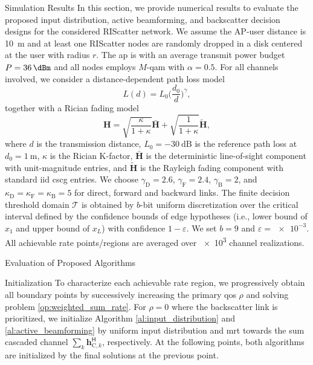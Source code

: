 \documentclass[journal]{IEEEtran}
\begin{document}
\begin{section}{Simulation Results}
	In this section, we provide numerical results to evaluate the proposed input distribution, active beamforming, and backscatter decision designs for the considered RIScatter network.
	We assume the AP-user distance is \SI{10}{\meter} and at least one RIScatter nodes are randomly dropped in a disk centered at the user with radius $r$.
	The \gls{ap} is with an average transmit power budget $P=\SI{36}{\dBm}$ and all nodes employs $M$-\gls{qam} with $\alpha=0.5$.
	For all channels involved, we consider a distance-dependent path loss model
	\begin{equation}
		L(d) = L_0 \biggl(\frac{d_0}{d}\biggr)^\gamma,
	\end{equation}
	together with a Rician fading model
	\begin{equation}
		\boldsymbol{H} = \sqrt{\frac{\kappa}{1+\kappa}} \bar{\boldsymbol{H}} + \sqrt{\frac{1}{1+\kappa}} \tilde{\boldsymbol{H}},
	\end{equation}
	where $d$ is the transmission distance, $L_0=-\SI{30}{\dB}$ is the reference path loss at $d_0=\SI{1}{\meter}$, $\kappa$ is the Rician K-factor, $\bar{\boldsymbol{H}}$ is the deterministic line-of-sight component with unit-magnitude entries, and $\tilde{\boldsymbol{H}}$ is the Rayleigh fading component with standard \gls{iid} \gls{cscg} entries.
	We choose $\gamma_{\text{D}}=2.6$, $\gamma_{\text{F}}=2.4$, $\gamma_{\text{B}}=2$, and $\kappa_{\text{D}}=\kappa_{\text{F}}=\kappa_{\text{B}}=5$ for direct, forward and backward links.
	The finite decision threshold domain $\mathcal{T}$ is obtained by $b$-bit uniform discretization over the critical interval defined by the confidence bounds of edge hypotheses (i.e., lower bound of $x_1$ and upper bound of $x_L$) with confidence $1-\varepsilon$.
	We set $b=9$ and $\varepsilon=\num{e-3}$.
	All achievable rate points/regions are averaged over \num{e3} channel realizations.

	\begin{subsection}{Evaluation of Proposed Algorithms}
		\begin{subsubsection}{Initialization}
			To characterize each achievable rate region, we progressively obtain all boundary points by successively increasing the primary \gls{qos} $\rho$ and solving problem \eqref{op:weighted_sum_rate}.
			For $\rho=0$ where the backscatter link is prioritized, we initialize Algorithm \ref{al:input_distribution} and \ref{al:active_beamforming} by uniform input distribution and \gls{mrt} towards the sum cascaded channel $\sum_{k} \boldsymbol{h}_{\text{C},k}^\mathsf{H}$, respectively.
			At the following points, both algorithms are initialized by the final solutions at the previous point.
		\end{subsubsection}


\end{subsection}
\end{section}
\end{document}
